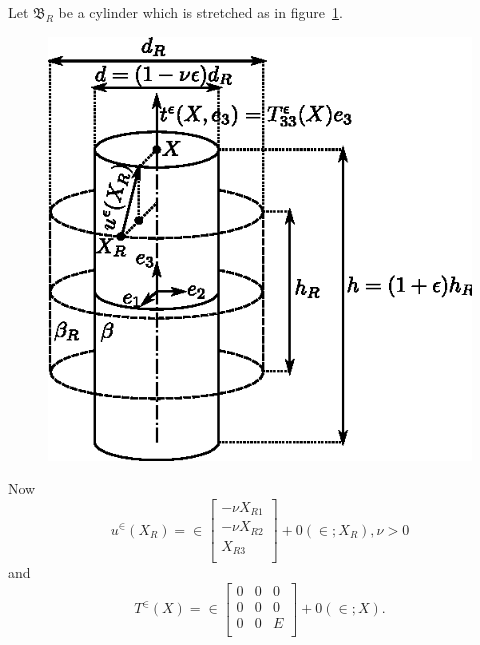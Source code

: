 \begin{experiment}\label{chap1-experiment3}%
  Let $\mathfrak{B}_R$ be a cylinder which is stretched as in
  figure~\ref{fig1.3.5}. 
  
  \begin{figure}[H]
    \centering
      \includegraphics{vol71-figures/fig1.3-5.eps}
    \medskip
    \caption{}\label{fig1.3.5}
  \end{figure}
\end{experiment}

Now\pageoriginale
\begin{equation*}
  u^\in (X_R) = \in
  \begin{bmatrix}
    -\nu X_{R1}\\
    -\nu X_{R2}\\
    X_{R3}\\
  \end{bmatrix}
  + 0 (\in ; X_R), \nu > 0 \tag{1.3-39}\label{eq1.3-39}
\end{equation*}
and 
\begin{equation*}
  T^\in (X) = \in
  \begin{bmatrix}
    0 & 0 & 0\\
    0 & 0 & 0\\
    0 & 0 & E\\
  \end{bmatrix}
  + 0 (\in ; X). \tag{1.3-40}\label{eq1.3-40}
\end{equation*}

